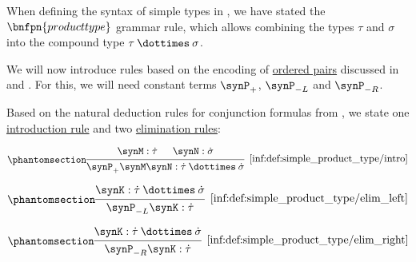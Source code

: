 \begin{definition}\label{def:simple_product_type}\mimprovised
  When defining the syntax of simple types in , we have stated the \( \bnfpn{product type} \) grammar rule, which allows combining the types \( \tau \) and \( \sigma \) into the compound type \( \tau \syntimes \sigma \).

  We will now introduce rules based on the encoding of \hyperref[def:ordered_tuple]{ordered pairs} discussed in  and . For this, we will need constant terms \( \synP_+ \), \( \synP_{-L} \) and \( \synP_{-R} \).

  Based on the natural deduction rules for conjunction formulas from , we state one \hyperref[rem:type_theory_rule_classification/intro]{introduction rule} and two \hyperref[rem:type_theory_rule_classification/elim]{elimination rules}:
  \begin{paracol}{3}
    \begin{nthcolumn}{0}
      \ParacolAlignmentHack
      \begin{equation*}\taglabel[\ensuremath{ \times_+ }]{inf:def:simple_product_type/intro}
        \begin{prooftree}
          \hypo{ \synM: \syn\tau }
          \hypo{ \synN: \syn\sigma }
          \infer2[\ref{inf:def:simple_product_type/intro}]{ \synP_+ \synM \synN: \syn\tau \syntimes \syn\sigma }
        \end{prooftree}
      \end{equation*}
    \end{nthcolumn}

    \begin{nthcolumn}{1}
      \ParacolAlignmentHack
      \begin{equation*}\taglabel[\ensuremath{ \times_{-L} }]{inf:def:simple_product_type/elim_left}
        \begin{prooftree}
          \hypo{ \synK: \syn\tau \syntimes \syn\sigma }
          \infer1[\ref{inf:def:simple_product_type/elim_left}]{ \synP_{-L} \synK: \syn\tau }
        \end{prooftree}
      \end{equation*}
    \end{nthcolumn}

    \begin{nthcolumn}{2}
      \ParacolAlignmentHack
      \begin{equation*}\taglabel[\ensuremath{ \times_{-R} }]{inf:def:simple_product_type/elim_right}
        \begin{prooftree}
          \hypo{ \synK: \syn\tau \syntimes \syn\sigma }
          \infer1[\ref{inf:def:simple_product_type/elim_right}]{ \synP_{-R} \synK: \syn\tau }
        \end{prooftree}
      \end{equation*}
    \end{nthcolumn}
  \end{paracol}
\end{definition}
